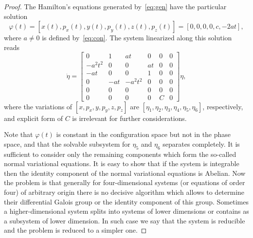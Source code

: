 \documentclass[pdftex]{sigma}
\numberwithin{equation}{section}
\begin{document}
\begin{proof}
 The Hamilton's equations generated by~\eqref{eq:gen} have the
 particular solution
 \begin{equation*}
 \varphi(t) = [x(t),p_x(t),y(t),p_y(t), z(t),p_z(t)] =
 [0, 0,0,0, c, -2 a t],
 \end{equation*}
 where $a\neq 0$ is defined by~\eqref{eq:con}. The system linearized
 along this solution reads
 \begin{equation} \label{VE}
 \dot\eta = \begin{bmatrix}
 0 & 1 & a t & 0 & 0 & 0 \\
 -a^2 t^2 & 0 & 0 & at & 0 & 0 \\
 -a t& 0 & 0 & 1 & 0 & 0\\
 0 & -a t & - a^2 t^2 & 0 & 0 & 0\\
 0 & 0 & 0 & 0 & 0 & 0\\
 0 & 0 & 0 & 0 & C & 0 \end{bmatrix} \eta,
 \end{equation}
 where the variations of $[x,p_x,y,p_y,z,p_z]$ are
 $[\eta_1,\eta_2,\eta_3,\eta_4,\eta_5,\eta_6]$, respectively, and
 explicit form of $C$ is irrelevant for further considerations.

 Note that $\varphi(t)$ is constant in the configuration space but
 not in the phase space, and that the solvable subsystem for $\eta_5$
 and $\eta_6$ separates completely. It is sufficient to consider only
 the remaining components which form the so-called normal variational
 equations. It is easy to show that if the system is integrable then
 the identity component of the normal variational equations is
 Abelian. Now the problem is that generally for four-dimensional systems (or
 equations of order four) of arbitrary origin there is no decisive algorithm which
 allows to determine their differential Galois group or the identity component of this group. Sometimes a
 higher-dimensional system splits into systems of lower dimensions or
 contains as a subsystem of lower dimension. In such case we say that
 the system is reducible and the problem is reduced to a simpler one.


\end{proof}
\end{document}
